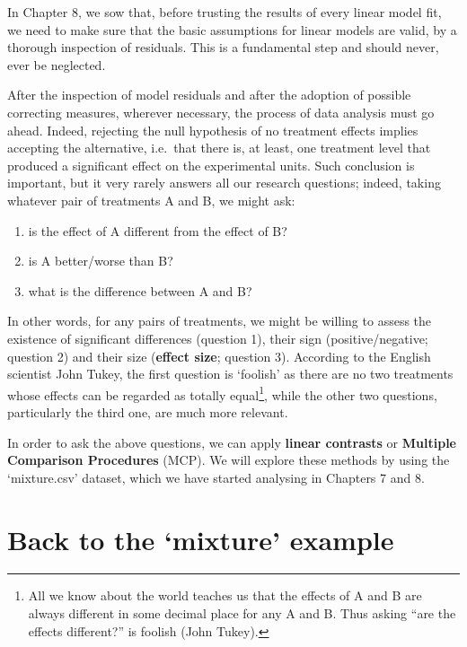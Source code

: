 \documentclass[a4paper,12pt,oneside]{book}
\providecommand{\tightlist}{%
  \setlength{\itemsep}{0pt}\setlength{\parskip}{0pt}}
\begin{document}
In Chapter 8, we sow that, before trusting the results of every linear model fit, we need to make sure that the basic assumptions for linear models are valid, by a thorough inspection of residuals. This is a fundamental step and should never, ever be neglected.

After the inspection of model residuals and after the adoption of possible correcting measures, wherever necessary, the process of data analysis must go ahead. Indeed, rejecting the null hypothesis of no treatment effects implies accepting the alternative, i.e.~that there is, at least, one treatment level that produced a significant effect on the experimental units. Such conclusion is important, but it very rarely answers all our research questions; indeed, taking whatever pair of treatments A and B, we might ask:

\begin{enumerate}
\def\labelenumi{\arabic{enumi}.}
\tightlist
\item
  is the effect of A different from the effect of B?
\item
  is A better/worse than B?
\item
  what is the difference between A and B?
\end{enumerate}

In other words, for any pairs of treatments, we might be willing to assess the existence of significant differences (question 1), their sign (positive/negative; question 2) and their size (\textbf{effect size}; question 3). According to the English scientist John Tukey, the first question is `foolish' as there are no two treatments whose effects can be regarded as totally equal\footnote{All we know about the world teaches us that the effects of A and B are always different in some decimal place for any A and B. Thus asking ``are the effects different?'' is foolish (John Tukey).}, while the other two questions, particularly the third one, are much more relevant.

In order to ask the above questions, we can apply \textbf{linear contrasts} or \textbf{Multiple Comparison Procedures} (MCP). We will explore these methods by using the `mixture.csv' dataset, which we have started analysing in Chapters 7 and 8.

\hypertarget{back-to-the-mixture-example}{%
\section{Back to the `mixture' example}\label{back-to-the-mixture-example}}
\end{document}
